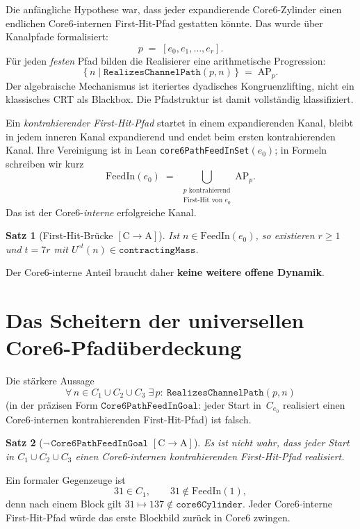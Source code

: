 \documentclass[11pt,a4paper]{article}
\newtheorem{theorem}{Satz}
\theoremstyle{definition}
\theoremstyle{remark}
\newcommand{\CA}{\ensuremath{[\mathrm{C}\!\to\!\mathrm{A}]}}
\newcommand{\FeedIn}{\mathrm{FeedIn}}
\newcommand{\Umap}{U}
\newcommand{\AP}{\mathrm{AP}}
\begin{document}
Die anfängliche Hypothese war, dass jeder expandierende Core6-Zylinder einen
endlichen Core6-internen First-Hit-Pfad gestatten könnte. Das wurde über
Kanalpfade formalisiert:
\[
  p
  \;=\;
  [e_0,e_1,\ldots,e_r].
\]
Für jeden \emph{festen} Pfad bilden die Realisierer eine arithmetische
Progression:
\[
  \bigl\{\, n \;\big|\; \mathtt{RealizesChannelPath}(p,n) \,\bigr\}
  \;=\;
  \AP_p.
\]
Der algebraische Mechanismus ist iteriertes dyadisches Kongruenzlifting,
nicht ein klassisches CRT als Blackbox. Die Pfadstruktur ist damit
vollständig klassifiziert.

Ein \emph{kontrahierender First-Hit-Pfad} startet in einem expandierenden
Kanal, bleibt in jedem inneren Kanal expandierend und endet beim ersten
kontrahierenden Kanal. Ihre Vereinigung ist in Lean
\texttt{core6PathFeedInSet}$(e_0)$; in Formeln schreiben wir kurz
\[
  \FeedIn(e_0)
  \;=\;
  \bigcup_{\substack{p\text{ kontrahierend}\\\text{First-Hit von }e_0}}
  \AP_p.
\]
Das ist der Core6-\emph{interne} erfolgreiche Kanal.

\begin{theorem}[First-Hit-Brücke \CA]
Ist $n\in\FeedIn(e_0)$, so existieren $r\ge 1$ und $t=7r$ mit
$\Umap^{\circ t}(n)\in\mathtt{contractingMass}$.
\end{theorem}
Der Core6-interne Anteil braucht daher \textbf{keine weitere offene Dynamik}.

\section{Das Scheitern der universellen Core6-Pfadüberdeckung}

Die stärkere Aussage
\[
  \forall\, n\in C_1\cup C_2\cup C_3\;
  \exists\, p:\ \mathtt{RealizesChannelPath}(p,n)
\]
(in der präzisen Form $\mathtt{Core6PathFeedInGoal}$: jeder Start in~$C_{e_0}$
realisiert einen Core6-internen kontrahierenden First-Hit-Pfad) ist falsch.

\begin{theorem}[$\neg\,\mathtt{Core6PathFeedInGoal}$ \CA]
Es ist nicht wahr, dass jeder Start in $C_1\cup C_2\cup C_3$ einen
Core6-internen kontrahierenden First-Hit-Pfad realisiert.
\end{theorem}

Ein formaler Gegenzeuge ist
\[
  31\in C_1,
  \qquad
  31\notin\FeedIn(1),
\]
denn nach einem Block gilt $31\mapsto 137\notin\mathtt{core6Cylinder}$.
Jeder Core6-interne First-Hit-Pfad würde das erste Blockbild zurück in
Core6 zwingen.
\end{document}
